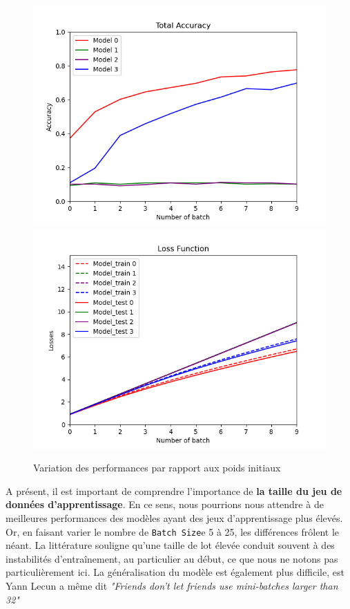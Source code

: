 \documentclass[a4paper]{article}
\newcommand{\code}[2]{\colorbox{light-gray}{\texttt{#1}}}
\begin{document}
		\begin{figure}[!ht]
			\centering
			\includegraphics[width=.5\textwidth]{Fig_acc_p3_weight.png}\hfill
			\includegraphics[width=.5\textwidth]{Fig_losses_p3_weight.png}\hfill
			\caption{Variation des performances par rapport aux poids initiaux}	
		\end{figure}

	A présent, il est important de comprendre l'importance de \textbf{la taille du jeu de données d'apprentissage}. En ce sens, nous pourrions nous attendre à de meilleures performances des modèles ayant des jeux d'apprentissage plus élevés. Or, en faisant varier le nombre de \code{Batch Size} de 5 à 25, les différences frôlent le néant. La littérature souligne qu'une taille de lot élevée conduit souvent à des instabilités d'entraînement, au particulier au début, ce que nous ne notons pas particulièrement ici. La généralisation du modèle est également plus difficile, est Yann Lecun a même dit \textit{"Friends don't let friends use mini-batches larger than 32"}
	
\end{document}
